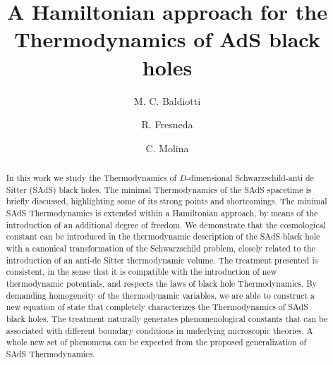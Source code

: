 \documentclass[prd,onecolumn,notitlepage,amsmath,nofootinbib,superscriptaddress,showpacs,showkeys]{revtex4-1}
\begin{document}
\title{A Hamiltonian approach for the Thermodynamics of AdS black holes}

\author{M. C. Baldiotti}
%



\author{R. Fresneda}
%



\author{C. Molina}
%



\begin{abstract}
In this work we study the Thermodynamics of $D$-dimensional 
Schwarzschild-anti de Sitter (SAdS) black holes. The minimal 
Thermodynamics of the SAdS
spacetime is briefly discussed, highlighting some of its strong points
and shortcomings. The minimal SAdS Thermodynamics is extended within
a Hamiltonian approach, by means of the introduction of an additional
degree of freedom. We demonstrate that the cosmological constant can
be introduced in the thermodynamic description of the SAdS black hole
with a canonical transformation of the Schwarzschild problem, closely
related to the introduction of an anti-de Sitter thermodynamic volume.
The treatment presented is consistent, in the sense that it is compatible
with the introduction of new thermodynamic potentials, and respects
the laws of black hole Thermodynamics. By demanding homogeneity of
the thermodynamic variables, we are able to construct a new equation
of state that completely characterizes the Thermodynamics of SAdS
black holes. The treatment naturally generates phenomenological constants
that can be associated with different boundary conditions in underlying
microscopic theories. A whole new set of phenomena can be expected
from the proposed generalization of SAdS Thermodynamics. 
\end{abstract}



\maketitle
\end{document}
